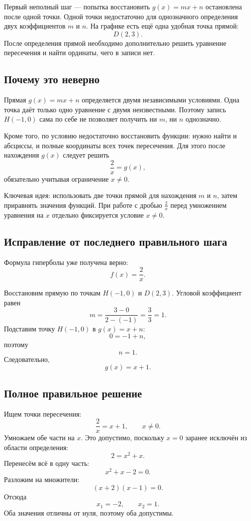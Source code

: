 \documentclass[12pt,a4paper]{article}
\begin{document}
Первый неполный шаг --- попытка восстановить \(g(x)=mx+n\) остановлена после одной точки. Одной точки недостаточно для однозначного определения двух коэффициентов \(m\) и \(n\). На графике есть ещё одна удобная точка прямой:
\[
  D(2,3).
\]
После определения прямой необходимо дополнительно решить уравнение пересечения и найти ординаты, чего в записи нет.

\subsection*{Почему это неверно}
Прямая \(g(x)=mx+n\) определяется двумя независимыми условиями. Одна точка даёт только одно уравнение с двумя неизвестными. Поэтому запись \(H(-1,0)\) сама по себе не позволяет получить ни \(m\), ни \(n\) однозначно.

Кроме того, по условию недостаточно восстановить функции: нужно найти и абсциссы, и полные координаты всех точек пересечения. Для этого после нахождения \(g(x)\) следует решить
\[
  \frac{2}{x}=g(x),
\]
обязательно учитывая ограничение \(x\ne0\).

\textcolor{blue!60!black}{Ключевая идея:} использовать две точки прямой для нахождения \(m\) и \(n\), затем приравнять значения функций. При работе с дробью \(\frac{2}{x}\) перед умножением уравнения на \(x\) отдельно фиксируется условие \(x\ne0\).

\subsection*{Исправление от последнего правильного шага}
Формула гиперболы уже получена верно:
\[
  f(x)=\frac{2}{x}.
\]

Восстановим прямую по точкам \(H(-1,0)\) и \(D(2,3)\). Угловой коэффициент равен
\[
  m=\frac{3-0}{2-(-1)}=\frac{3}{3}=1.
\]
Подставим точку \(H(-1,0)\) в \(g(x)=x+n\):
\[
  0=-1+n,
\]
поэтому
\[
  n=1.
\]
Следовательно,
\[
  g(x)=x+1.
\]

\subsection*{Полное правильное решение}
Ищем точки пересечения:
\[
  \frac{2}{x}=x+1,
  \qquad x\ne0.
\]
Умножаем обе части на \(x\). Это допустимо, поскольку \(x=0\) заранее исключён из области определения:
\[
  2=x^2+x.
\]
Перенесём всё в одну часть:
\[
  x^2+x-2=0.
\]
Разложим на множители:
\[
  (x+2)(x-1)=0.
\]
Отсюда
\[
  x_1=-2, \qquad x_2=1.
\]
Оба значения отличны от нуля, поэтому оба допустимы.
\end{document}
